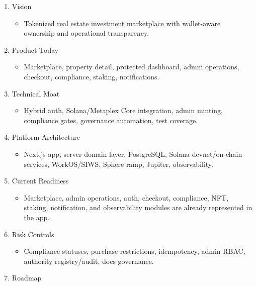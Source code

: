 \documentclass[
  10pt,
  letterpaper,
]{article}
\providecommand{\tightlist}{%
  \setlength{\itemsep}{0pt}\setlength{\parskip}{0pt}}
\begin{document}
\begin{enumerate}
\def\labelenumi{\arabic{enumi}.}
\tightlist
\item
  Vision

  \begin{itemize}
  \tightlist
  \item
    Tokenized real estate investment marketplace with wallet-aware
    ownership and operational transparency.
  \end{itemize}
\item
  Product Today

  \begin{itemize}
  \tightlist
  \item
    Marketplace, property detail, protected dashboard, admin operations,
    checkout, compliance, staking, notifications.
  \end{itemize}
\item
  Technical Moat

  \begin{itemize}
  \tightlist
  \item
    Hybrid auth, Solana/Metaplex Core integration, admin minting,
    compliance gates, governance automation, test coverage.
  \end{itemize}
\item
  Platform Architecture

  \begin{itemize}
  \tightlist
  \item
    Next.js app, server domain layer, PostgreSQL, Solana devnet/on-chain
    services, WorkOS/SIWS, Sphere ramp, Jupiter, observability.
  \end{itemize}
\item
  Current Readiness

  \begin{itemize}
  \tightlist
  \item
    Marketplace, admin operations, auth, checkout, compliance, NFT,
    staking, notification, and observability modules are already
    represented in the app.
  \end{itemize}
\item
  Risk Controls

  \begin{itemize}
  \tightlist
  \item
    Compliance statuses, purchase restrictions, idempotency, admin RBAC,
    authority registry/audit, docs governance.
  \end{itemize}
\item
  Roadmap


\end{enumerate}
\end{document}

